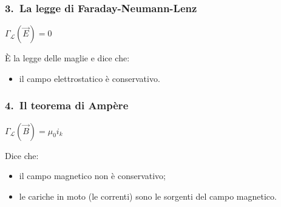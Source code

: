 \documentclass[]{beamer}
\theoremstyle{plain}
\begin{document}
\begin{frame}
  \frametitle{3.~La legge di Faraday-Neumann-Lenz}
  \begin{center}
\colorbox{blue!30}{  $ \Gamma_\mathscr{L} (\vec{E}) = 0 $}
  \end{center}\pause
  È la legge delle maglie e dice che:
  \begin{itemize}
    \item il campo elettrostatico è conservativo.
  \end{itemize}
\end{frame}

\begin{frame}
  \frametitle{4.~Il teorema di Ampère}
  \begin{center}
\colorbox{blue!30}{$ \Gamma_\mathscr{L} (\vec{B}) = \mu_0 i_k $}
  \end{center}\pause
  Dice che:
  \begin{itemize}
    \item il campo magnetico non è conservativo;\pause
    \item le cariche in moto (le correnti) sono le sorgenti del campo magnetico.
  \end{itemize}
\end{frame}
\end{document}
